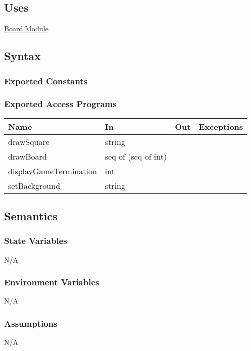 \documentclass[12pt, titlepage]{article}
\begin{document}
    \subsection{Uses}
    \hyperref[mBoard]{Board Module}

    \subsection{Syntax}
    \subsubsection{Exported Constants}

    \subsubsection{Exported Access Programs}
        \begin{center}
        \begin{tabular}{p{5cm} p{3.5cm} p{3cm} p{2.5cm}}
        \hline
        \textbf{Name} & \textbf{In} & \textbf{Out} & \textbf{Exceptions} \\
        \hline
        drawSquare & string & & \\
        \hline
        drawBoard & seq of (seq of int) & & \\
        \hline
        displayGameTermination & int & & \\
        \hline
        setBackground & string & & \\
        \hline
        \end{tabular}
        \end{center}

    \subsection{Semantics}
    \subsubsection{State Variables}
    N/A

    \subsubsection{Environment Variables}
    N/A

    \subsubsection{Assumptions}
    N/A
\end{document}
